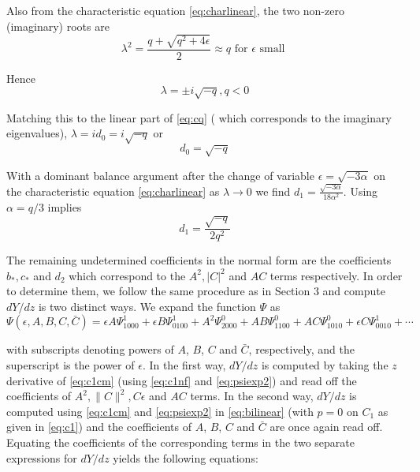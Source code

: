 Also from the characteristic equation \eqref{eq:charlinear}, the two non-zero 
(imaginary) roots are 
\begin{equation}
\lambda^2 = \frac{ q + \sqrt{q^2 + 4 \epsilon } }{2} \approx q \textrm{ for } \epsilon \textrm{ small }
\end{equation}

Hence
\begin{equation}
\lambda = \pm i \sqrt{-q}, q < 0
\end{equation}

Matching this to the linear part of \eqref{eq:cq} ( which corresponds to the
imaginary eigenvalues), $\lambda = i d_0 = i \sqrt{-q}$ or 
\begin{equation}
d_0 = \sqrt{-q}
\end{equation}


With a dominant balance argument after the change of variable $\epsilon =
\sqrt{-3 \alpha}$ on the characteristic equation \eqref{eq:charlinear} as $\lambda \rightarrow 0 $ we
find $d_1 = \frac{ \sqrt{-3 \alpha} }{18 \alpha^2 } $. Using $\alpha=q/3$
implies 
\begin{equation}
d_1 = \frac{\sqrt{-q}}{2 q^2}
\end{equation}

The remaining undetermined coefficients  in the normal form are the 
coefficients $b_*,c_*$ and $d_2$ 
which correspond to the $A^2, |C|^2$ and $AC$ terms respectively. In 
order to determine them, we follow the same procedure as 
in Section 3 and compute $dY/dz$ is two distinct ways. We expand the
function $\Psi$ as
\begin{equation}\label{eq:psiexp2}
\Psi(\epsilon,A,B,C,\bar{C}) = \epsilon A \Psi_{1000}^1 + \epsilon B \Psi_{0100}^1 + A^2 \Psi_{2000}^0 + A B \Psi_{1100}^0 + A C \Psi_{1010}^0 + \epsilon C \Psi_{0010}^1 + \cdots 
\end{equation}

with subscripts denoting powers of $A$, $B$, $C$ and $\bar{C}$, respectively,
and the superscript is the power of $\epsilon$. In the first way, $dY/dz$ is
computed by taking the $z$ derivative of \eqref{eq:c1cm} (using \eqref{eq:c1nf}
and \eqref{eq:psiexp2}) and read off the coefficients of $A^2, \|C\|^2, C
\epsilon$ and $AC$ terms.  In the second way, $dY/dz$ is computed using
\eqref{eq:c1cm} and \eqref{eq:psiexp2} in \eqref{eq:bilinear} (with $p=0$ on
$C_1$ as given in \eqref{eq:c1}) and the coefficients of  $A$, $B$, $C$ and
$\bar{C}$ are once again read off.  Equating the coefficients of the
corresponding terms in the two separate expressions for $dY/dz$ yields the
following equations:


